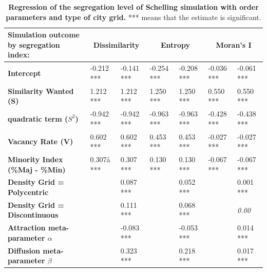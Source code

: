 \documentclass[Royal,sageh,times]{sagej}
\begin{document}
\begin{table}[]
\centering
\caption{\textbf{Regression of the segregation level of Schelling simulation with order parameters and type of city grid.} *** means that the estimate is significant.}
\label{tab:regressionSchelling}
\begin{adjustwidth}{-0.5cm}{-0.5cm}
\begin{tabular}{|m{2.5cm}|ll|ll|ll|}
\hline
Simulation outcome by segregation index:    & \multicolumn{2}{c|}{\textbf{Dissimilarity}}   & \multicolumn{2}{c|}{\textbf{Entropy}} & \multicolumn{2}{c|}{\textbf{Moran's I}} \\ \hline
\textbf{Intercept}                          & -0.212 *** & -0.141 ***                       & -0.254 ***        & -0.208 ***        & -0.036 ***           & -0.061 ***               \\ \hline
\textbf{Similarity Wanted (S)}              & 1.212 ***  & 1.212 ***                        & 1.250 ***         & 1.250 ***         & 0.550 ***            & 0.550 ***                \\ 
\textbf{quadratic term ($S^2$)}               & -0.942 *** & -0.942 ***                       & -0.963 ***        & -0.963 ***        & -0.428 ***           & -0.438 ***               \\ 
\textbf{Vacancy Rate (V)}                   & 0.602 ***  & 0.602 ***                        & 0.453 ***         & 0.453 ***         & -0.027 ***           & -0.027 ***               \\ 
\textbf{Minority Index (\%Maj - \%Min)}     & 0.307å ***  & 0.307 ***                        & 0.130 ***         & 0.130 ***         & -0.067 ***           & -0.067 ***               \\ \hline
\textbf{Density Grid = Polycentric}         &            & 0.087 ***                        &                   & 0.052 ***         &                      & 0.001 ***                \\ 
\textbf{Density Grid = Discontinuous}       &            & 0.111 ***                        &                   & 0.068 ***         &                      & \textit{0.00}              \\
\textbf{Attraction meta-parameter $\alpha$} &            & -0.083 ***                       &                   & -0.053 ***        &                      & 0.014 ***                \\ 
\textbf{Diffusion meta-parameter $\beta$}   &            & 0.323 ***                        &                   & 0.218 ***         &                      & 0.017 ***           \\ \hline

\end{tabular}
\end{adjustwidth}
\end{table}
\end{document}
